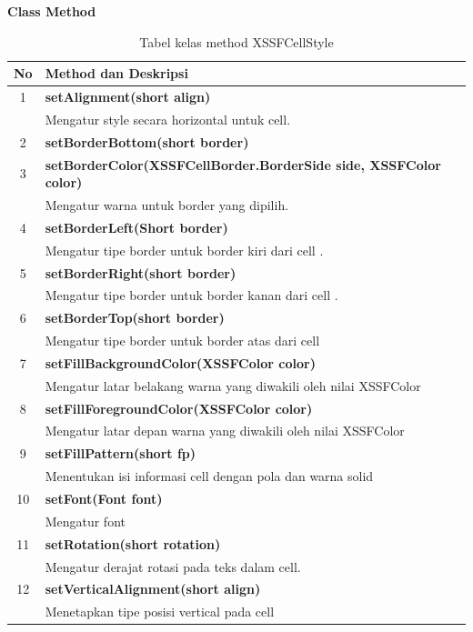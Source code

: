 \noindent \textbf{Class Method}
\begin{table}[H]
		\centering
		\caption{Tabel kelas method XSSFCellStyle}
		\label{tab:methodXSSFCellStyle}
	\begin{tabular}{|c|p{12cm}|}
		\hline
		\textbf{No} & \textbf{Method dan Deskripsi} \\ \hline \hline
		1 & \textbf{setAlignment(short align)}\\
			&	Mengatur style secara horizontal untuk cell.\\ \hline 
		2 & \textbf{setBorderBottom(short border)}\\ \hline
		3 & \textbf{setBorderColor(XSSFCellBorder.BorderSide side, XSSFColor color)}\\
			&	Mengatur warna untuk border yang dipilih.\\ \hline
		4 & \textbf{setBorderLeft(Short border)}\\
			&	Mengatur tipe border untuk border kiri dari cell .\\ \hline	
		5 & \textbf{setBorderRight(short border)}\\
			&	Mengatur tipe border untuk border kanan dari cell .\\ \hline
		6 & \textbf{setBorderTop(short border)}\\
			&	Mengatur tipe border untuk border atas dari cell \\ \hline
		7 & \textbf{setFillBackgroundColor(XSSFColor color)}\\
			&	Mengatur latar belakang warna yang diwakili oleh nilai XSSFColor\\ \hline
		8 & \textbf{setFillForegroundColor(XSSFColor color)}\\
			&	Mengatur latar depan warna yang diwakili oleh nilai XSSFColor\\ \hline
		9 & \textbf{setFillPattern(short fp)}\\
			&	Menentukan isi informasi cell dengan pola dan warna solid\\ \hline
	  10 & \textbf{setFont(Font font)}\\
			 &	Mengatur font\\ \hline
		11 & \textbf{setRotation(short rotation)}\\
			 &	Mengatur derajat rotasi pada teks dalam cell.\\ \hline
		12 & \textbf{setVerticalAlignment(short align)}\\
			 &	Menetapkan tipe posisi vertical pada cell\\ \hline		
	\end{tabular}
\end{table}


